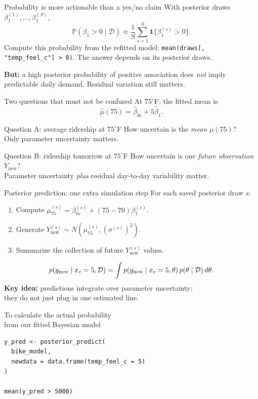 \documentclass[aspectratio=43,11pt]{beamer}
\newcommand{\Prob}{\mathbb{P}}
\newcommand{\dd}{\mathcal D}
\begin{document}
\begin{frame}{Probability is more actionable than a yes/no claim}
With posterior draws $\beta_1^{(1)},\ldots,\beta_1^{(S)}$,
\[\Prob(\beta_1>0\mid\dd)\approx\frac1S\sum_{s=1}^{S}\mathbf 1\{\beta_1^{(s)}>0\}.\]
Compute this probability from the refitted model: \texttt{mean(draws[, "temp\_feel\_c"] > 0)}. The answer depends on its posterior draws.
\par\medskip\textbf{But:} a high posterior probability of positive association does \emph{not} imply predictable daily demand. Residual variation still matters.
\end{frame}

\begin{frame}{Two questions that must not be confused}
At $75^\circ$F, the fitted mean is
\[\widehat\mu(75)=\widehat\beta_{0c}+5\widehat\beta_1.\]
\begin{block}{Question A: average ridership at $75^\circ$F}
How uncertain is the \emph{mean} $\mu(75)$?\\
Only parameter uncertainty matters.
\end{block}
\begin{block}{Question B: ridership tomorrow at $75^\circ$F}
How uncertain is one \emph{future observation} $Y_{\mathrm{new}}$?\\
Parameter uncertainty \emph{plus} residual day-to-day variability matter.
\end{block}
\end{frame}

\begin{frame}{Posterior prediction: one extra simulation step}
For each saved posterior draw $s$:
\begin{enumerate}
\item Compute $\mu_{75}^{(s)}=\beta_{0c}^{(s)}+(75-70)\beta_1^{(s)}$.
\item Generate $Y_{\mathrm{new}}^{(s)}\sim N(\mu_{75}^{(s)},(\sigma^{(s)})^2)$.
\item Summarize the collection of future $Y_{\mathrm{new}}^{(s)}$ values.
\end{enumerate}
\[p(y_{\rm new}\mid x_c=5,\dd)=\int p(y_{\rm new}\mid x_c=5,\theta)\,p(\theta\mid\dd)\,d\theta.\]
\textbf{Key idea:} predictions integrate over parameter uncertainty;\\
they do not just plug in one estimated line.
\end{frame}

\begin{frame}[fragile]{To calculate the actual probability\\from our fitted Bayesian model}
\begin{verbatim}
y_pred <- posterior_predict(
  bike_model,
  newdata = data.frame(temp_feel_c = 5)
)

mean(y_pred > 5000)
\end{verbatim}
\end{frame}
\end{document}
